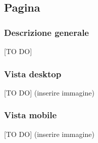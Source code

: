 	\subsection{Pagina} %
	\label{sub:pagina}
		\subsubsection{Descrizione generale} %
		[TO DO]

		\subsubsection{Vista desktop} %
		[TO DO] (inserire immagine)

		\subsubsection{Vista mobile} %
		[TO DO] (inserire immagine)
